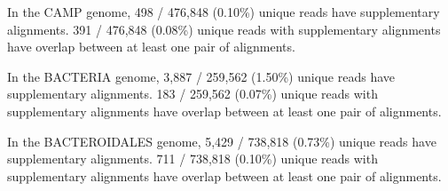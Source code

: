 In the CAMP genome, 498 / 476,848 (0.10\%) unique reads have supplementary alignments. 391 / 476,848 (0.08\%) unique reads with supplementary alignments have overlap between at least one pair of alignments.

In the BACTERIA genome, 3,887 / 259,562 (1.50\%) unique reads have supplementary alignments. 183 / 259,562 (0.07\%) unique reads with supplementary alignments have overlap between at least one pair of alignments.

In the BACTEROIDALES genome, 5,429 / 738,818 (0.73\%) unique reads have supplementary alignments. 711 / 738,818 (0.10\%) unique reads with supplementary alignments have overlap between at least one pair of alignments.
\endinput